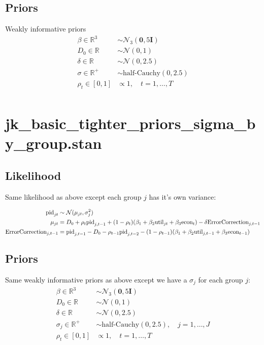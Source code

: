 \documentclass[11pt, oneside]{article}
\newcommand{\mc}[1]{\mathcal{#1}}
\begin{document}
\subsection*{Priors} 

Weakly informative priors
\begin{align*}
	\beta \in \mathbb{R}^3 &\sim \mc{N}_3(\mathbf{0}, 5\mathbf{I}) \\
	D_0 \in \mathbb{R} &\sim \mc{N}(0,1) \\
	\delta \in \mathbb{R} &\sim \mc{N}(0, 2.5)\\
	\sigma \in \mathbb{R}^+ &\sim \text{half-Cauchy}(0, 2.5) \\
	\rho_t \in [0,1] &\propto 1, \quad t = 1, \dots, T \\
\end{align*}




\section*{jk\_basic\_tighter\_priors\_sigma\_by\_group.stan}
\subsection*{Likelihood} 

Same likelihood as above except each group $j$ has it's own variance:

\begin{align*}
{\rm pid}_{jt} &
	\sim \mc{N}(\mu_{jt}, \sigma^2_j)  \\
%	
\mu_{jt} &= 
	D_0 + \rho_t {\rm pid}_{j, t-1} + 
	(1-\rho_t)(\beta_1 + \beta_2 {\rm util}_{jt} + \beta_3 {\rm econ}_t) - 
	\delta {\rm ErrorCorrection}_{j,t-1} \\
%	
 {\rm ErrorCorrection}_{j,t-1} &= 
 	{\rm pid}_{j, t-1} - D_0 - \rho_{t-1} {\rm pid}_{j, t-2} - 
	(1 - \rho_{t-1}) (\beta_1 + \beta_2 {\rm util}_{j,t-1} + \beta_3 {\rm econ}_{t-1}) 
%	
\end{align*}



\subsection*{Priors} 

Same weakly informative priors as above except we have a $\sigma_j$ for each group $j$:
\begin{align*}
	\beta \in \mathbb{R}^3 &\sim \mc{N}_3(\mathbf{0}, 5\mathbf{I}) \\
	D_0 \in \mathbb{R} &\sim \mc{N}(0,1) \\
	\delta \in \mathbb{R} &\sim \mc{N}(0, 2.5)\\
	\sigma_j \in \mathbb{R}^+ &\sim \text{half-Cauchy}(0, 2.5), \quad j = 1, \dots, J \\
	\rho_t \in [0,1] &\propto 1, \quad t = 1, \dots, T \\
\end{align*}
\end{document}
